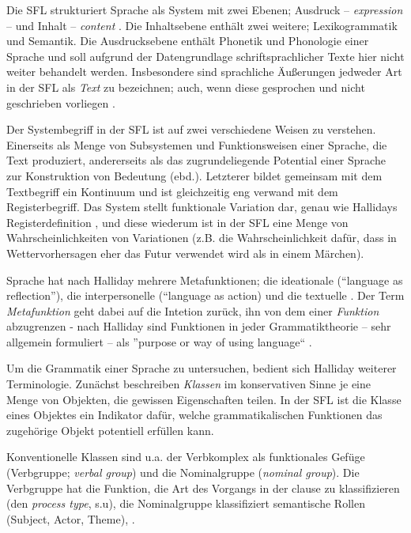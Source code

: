 Die SFL strukturiert Sprache als System mit zwei Ebenen; Ausdruck -- \textit{expression} -- und Inhalt -- \textit{content} \citep[24]{Halliday2004}. Die Inhaltsebene enthält zwei weitere; Lexikogrammatik und Semantik. Die Ausdrucksebene enthält Phonetik und Phonologie einer Sprache und soll aufgrund der Datengrundlage schriftsprachlicher Texte hier nicht weiter behandelt werden. Insbesondere sind sprachliche Äußerungen jedweder Art in der SFL als \textit{Text} zu bezeichnen; auch, wenn diese gesprochen und nicht geschrieben vorliegen \citep[26]{Halliday2004}.

Der Systembegriff in der SFL ist auf zwei verschiedene Weisen zu verstehen. Einerseits als Menge von Subsystemen und Funktionsweisen einer Sprache, die Text produziert, andererseits als das zugrundeliegende Potential einer Sprache zur Konstruktion von Bedeutung (ebd.).
Letzterer bildet gemeinsam mit dem Textbegriff ein Kontinuum und ist gleichzeitig eng verwand mit dem Registerbegriff. Das System stellt funktionale Variation dar, genau wie Hallidays Registerdefinition \citep[27]{Halliday2004}, und diese wiederum ist in der SFL eine Menge von Wahrscheinlichkeiten von Variationen (z.B. die Wahrscheinlichkeit dafür, dass in Wettervorhersagen eher das Futur verwendet wird als in einem Märchen).

Sprache hat nach Halliday mehrere Metafunktionen; die ideationale (``language as reflection''), die interpersonelle (``language as action) und die textuelle
\citep[29--30]{Halliday2004}. Der Term \textit{Metafunktion} geht dabei auf die Intetion zurück, ihn von dem einer \textit{Funktion} abzugrenzen - nach Halliday sind Funktionen in jeder Grammatiktheorie -- sehr allgemein formuliert -- als ''purpose or way of using language`` \citep[30]{Halliday2004}.

Um die Grammatik einer Sprache zu untersuchen, bedient sich Halliday weiterer Terminologie. Zunächst beschreiben \textit{Klassen} im konservativen Sinne je eine Menge von Objekten, die gewissen Eigenschaften teilen. In der SFL ist die Klasse eines Objektes ein Indikator dafür, welche grammatikalischen Funktionen das zugehörige Objekt potentiell erfüllen kann.

Konventionelle Klassen sind u.a. der Verbkomplex als funktionales Gefüge (Verbgruppe; \textit{verbal group}) und die Nominalgruppe (\textit{nominal group}). Die Verbgruppe hat die Funktion, die Art des Vorgangs in der clause zu klassifizieren (den \textit{process type}, s.u), die Nominalgruppe klassifiziert semantische Rollen (Subject, Actor, Theme), \cite[53--58]{Halliday2004}.

